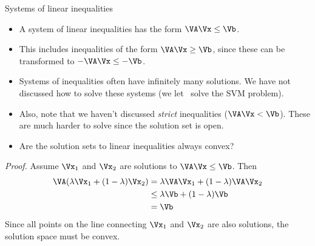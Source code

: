 \documentclass[9pt]{beamer}
\begin{document}
\begin{frame}{Systems of linear inequalities}
\begin{itemize}
	\item A system of linear inequalities has the form $\VA\Vx \leq \Vb$.
	\item This includes inequalities of the form $\VA\Vx\geq\Vb$, since these can be transformed to $-\VA\Vx\leq-\Vb$.
	\item Systems of inequalities often have infinitely many solutions. We have not discussed how to solve these systems (we let \Matlab\ solve the SVM problem).
	\item Also, note that we haven't discussed \emph{strict} inequalities ($\VA\Vx<\Vb$). These are much harder to solve since the solution set is open.
	\item Are the solution sets to linear inequalities always convex?\
\end{itemize}
\pause
\medskip
{\small
\emph{Proof.} Assume $\Vx_1$ and $\Vx_2$ are solutions to $\VA\Vx\leq\Vb$. Then
\begin{align*}
	\VA(\lambda\Vx_1 + (1-\lambda)\Vx_2) &= \lambda\VA\Vx_1 + (1-\lambda)\VA\Vx_2 \\
		&\leq \lambda\Vb + (	1-\lambda)\Vb \\
		&= \Vb	
\end{align*}
Since all points on the line connecting $\Vx_1$ and $\Vx_2$ are also solutions, the solution space must be convex.
}
\end{frame}
\end{document}
